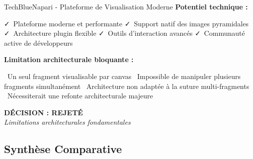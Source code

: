 \documentclass[12pt,a4paper]{report}
\newcommand{\pro}[1]{\textcolor{SuccessGreen}{\faCheck\ #1}}
\newcommand{\con}[1]{\textcolor{DangerRed}{\faTimes\ #1}}
\begin{document}
\begin{}
\begin{}
\begin{}
\begin{}
\begin{techbox}{TechBlue}{Napari - Plateforme de Visualisation Moderne}
\textbf{Potentiel technique :}
\begin{itemize}[leftmargin=*]
    \pro{Plateforme moderne et performante}
    \pro{Support natif des images pyramidales}
    \pro{Architecture plugin flexible}
    \pro{Outils d'interaction avancés}
    \pro{Communauté active de développeurs}
\end{itemize}

\textbf{Limitation architecturale bloquante :}
\begin{itemize}[leftmargin=*]
    \con{Un seul fragment visualisable par canvas}
    \con{Impossible de manipuler plusieurs fragments simultanément}
    \con{Architecture non adaptée à la suture multi-fragments}
    \con{Nécessiterait une refonte architecturale majeure}
\end{itemize}

\begin{center}
\textbf{\textcolor{DangerRed}{DÉCISION : REJETÉ}}\\
\textit{Limitations architecturales fondamentales}
\end{center}

\end{techbox}

\subsection{Synthèse Comparative}


\end{}
\end{}
\end{}
\end{}
\end{document}
